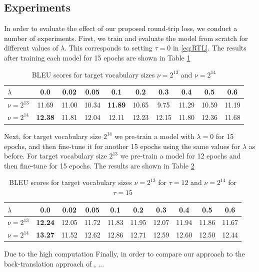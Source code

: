 \documentclass[11pt,a4paper]{article}
\begin{document}
\subsection{Experiments}
In order to evaluate the effect of our proposed round-trip loss, we conduct a number of experiments. First, we train and evaluate the model from scratch for different values of $\lambda$. This corresponds to setting $\tau=0$ in \eqref{eq:RTL}. The results after training each model for 15 epochs are shown in Table \ref{tab:result1}
\begin{table} [ht]
\centering
\small
\begin{tabular}{ l || c | c | c | c | c | c | c | c | c  }
  $\lambda$ & 0.0 & 0.02 & 0.05 & 0.1 & 0.2 & 0.3 & 0.4 & 0.5 & 0.6 \\ \hline
  $\nu=2^{13}$ & 11.69 & 11.00 & 10.34 & \textbf{11.89} & 10.65 & 9.75 & 11.29 & 10.59 & 11.19 \\
  $\nu=2^{14}$ & \textbf{12.38} & 11.81 & 12.04 & 12.11 & 12.23 & 12.15 & 11.80 & 12.36 & 11.68 \\
\end{tabular}
\caption{BLEU scores for target vocabulary sizes $\nu=2^{13}$ and $\nu=2^{14}$}
\label{tab:result1}
\end{table}

Next, for target vocabulary size $2^{14}$ we pre-train a model with $\lambda=0$ for 15 epochs, and then fine-tune it for another 15 epochs using the same values for $\lambda$ as before. For target vocabulary size $2^{13}$ we pre-train a model for 12 epochs and then fine-tune for 15 epochs. The results are shown in Table \ref{tab:result2}
\begin{table} [ht]
\centering
\small
\begin{tabular}{ l || c | c | c | c | c | c | c | c | c  }
  $\lambda$ & 0.0 & 0.02 & 0.05 & 0.1 & 0.2 & 0.3 & 0.4 & 0.5 & 0.6 \\ \hline
  $\nu=2^{13}$ & \textbf{12.24} & 12.05 & 11.72 & 11.83 & 11.95 & 12.07 & 11.94 & 11.86 & 11.67 \\
  $\nu=2^{14}$ & \textbf{13.27} & 11.52 & 12.62 & 12.86 & 12.71 & 12.59 & 12.60 & 12.50 & 12.44 \\
\end{tabular}
\caption{BLEU scores for target vocabulary sizes $\nu=2^{13}$ for $\tau=12$ and $\nu=2^{14}$ for $\tau=15$}
\label{tab:result2}
\end{table}

Due to the high computation
Finally, in order to compare our approach to the back-translation approach of \citet{backtrans}, ...
\end{document}
